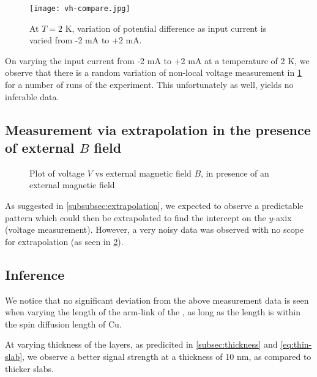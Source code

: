 \begin{figure}[h]
    \texttt{[image: vh-compare.jpg]}
    \caption{At \( T = 2 \) K, variation of potential difference as input current is varied from -2 mA to +2 mA.}
    \label{fig:vh-compare}
\end{figure}

On varying the input current from -2 mA to +2 mA at a temperature of 2 K, we observe that there is a random variation of non-local voltage measurement in \cref{fig:vh-compare} for a number of runs of the experiment. This unfortunately as well, yields no inferable data.

\subsection{Measurement via extrapolation in the presence of external \( B \) field}

\begin{figure}[h]
    
    \caption{Plot of voltage \( V \) vs external magnetic field \( B \), in presence of an external magnetic field}
    \label{fig:b-extrapolation}
\end{figure}

As suggested in \cref{subsubsec:extrapolation}, we expected to observe a predictable pattern which could then be extrapolated to find the intercept on the \( y \)-axix (voltage measurement).
However, a very noisy data was observed with no scope for extrapolation (as seen in \cref{fig:b-extrapolation}).


\subsection{Inference}

We notice that no significant deviation from the above measurement data is seen when varying the length of the arm-link of the \Hst, as long as the length is within the spin diffusion length of Cu.

At varying thickness of the layers, as predicited in \cref{subsec:thickness} and \cref{eq:thin-slab}, we observe a better signal strength at a thickness of 10 nm, as compared to thicker slabs.
